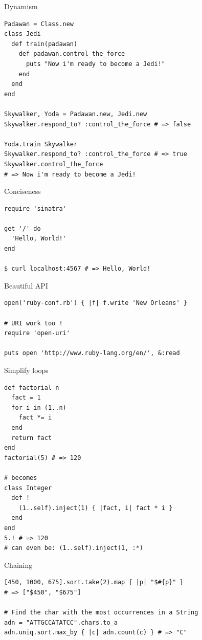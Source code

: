 \documentclass[10pt]{beamer}
\begin{document}
\begin{frame}[fragile]{Dynamism}
\begin{lstlisting}[xleftmargin=-10pt]
Padawan = Class.new
class Jedi
  def train(padawan)
    def padawan.control_the_force
      puts "Now i'm ready to become a Jedi!"
    end
  end
end

Skywalker, Yoda = Padawan.new, Jedi.new
Skywalker.respond_to? :control_the_force # => false

Yoda.train Skywalker
Skywalker.respond_to? :control_the_force # => true
Skywalker.control_the_force
# => Now i'm ready to become a Jedi!
\end{lstlisting}
\end{frame}

\begin{frame}[fragile]{Conciseness}
\begin{lstlisting}[xleftmargin=30pt]
require 'sinatra'

get '/' do
  'Hello, World!'
end

$ curl localhost:4567 # => Hello, World!
\end{lstlisting}
\end{frame}

\begin{frame}[fragile]{Beautiful API}
\begin{lstlisting}[xrightmargin=-10pt]
open('ruby-conf.rb') { |f| f.write 'New Orleans' }

# URI work too !
require 'open-uri'

puts open 'http://www.ruby-lang.org/en/', &:read
\end{lstlisting}
\end{frame}

\begin{frame}[fragile]{Simplify loops}
\begin{lstlisting}
def factorial n
  fact = 1
  for i in (1..n)
    fact *= i
  end
  return fact
end
factorial(5) # => 120

# becomes
class Integer
  def !
    (1..self).inject(1) { |fact, i| fact * i }
  end
end
5.! # => 120
# can even be: (1..self).inject(1, :*)
\end{lstlisting}
\end{frame}

\begin{frame}[fragile]{Chaining}
\begin{lstlisting}[xrightmargin=-10pt]
[450, 1000, 675].sort.take(2).map { |p| "$#{p}" }
# => ["$450", "$675"]

# Find the char with the most occurrences in a String
adn = "ATTGCCATATCC".chars.to_a
adn.uniq.sort.max_by { |c| adn.count(c) } # => "C"
\end{lstlisting}
\end{frame}
\end{document}
